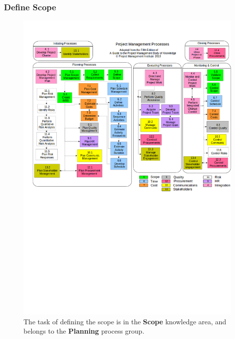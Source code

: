 \documentclass{beamer}
\begin{document}
\begin{frame}
\frametitle{Define Scope}
\begin{figure}
\caption{The task of defining the scope is in the \textbf{Scope} knowledge area, and belongs to the \textbf{Planning} process group.}
\vspace{-0.8cm}
\includegraphics[scale=0.3]{mapping}
\end{figure}
\end{frame}

\end{document}
